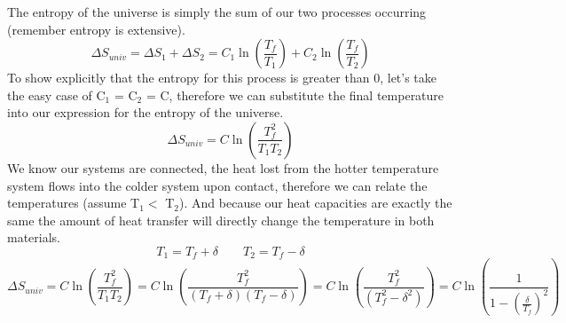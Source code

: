 \documentclass{article}
\begin{document}
 The entropy of the universe is simply the sum of our two processes occurring (remember entropy is extensive). 
 \begin{equation}
     \Delta S_{univ} = \Delta S_1 + \Delta S_2 = C_1\ln \left(\frac{T_f}{T_1}\right) + C_2\ln \left(\frac{T_f}{T_2}\right)
 \end{equation}
 To show explicitly that the entropy for this process is greater than 0, let's take the easy case of C$_1$ = C$_2$ = C, therefore we can substitute the final temperature into our expression for the entropy of the universe. 
  \begin{equation}
     \Delta S_{univ} = C\ln \left(\frac{T_f^2}{T_1T_2}\right) 
 \end{equation}
 We know our systems are connected, the heat lost from the hotter temperature system flows into the colder system upon contact, therefore we can relate the temperatures (assume T$_1 <$ T$_2$). 
 And because our heat capacities are exactly the same the amount of heat transfer will directly change the temperature in both materials.
 \begin{equation}
 T_1 = T_f + \delta \qquad T_2 = T_f - \delta 
 \end{equation}
   \begin{equation}
     \Delta S_{univ} = C\ln \left(\frac{T_f^2}{T_1T_2}\right) = C\ln \left(\frac{T_f^2}{(T_f + \delta) (T_f-\delta)}\right) =  C\ln \left(\frac{T_f^2}{(T_f^2 - \delta^2)}\right) 
     =  C\ln \left(\frac{1}{1-(\frac{\delta}{T_f})^2}\right)
 \end{equation}
 
\end{document}
